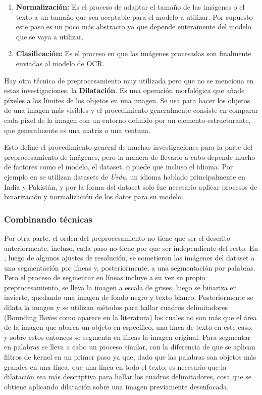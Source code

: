 \documentclass{article}
\begin{document}
\begin{enumerate}
    \item \textbf{Normalización:} Es el proceso de adaptar el tamaño de las imágenes o el texto a un tamaño que sea aceptable para el modelo a utilizar. Por supuesto este paso es un poco más abstracto ya que depende enteramente del modelo que se vaya a utilizar.

    \item \textbf{Clasificación:} Es el proceso en que las imágenes procesadas son finalmente enviadas al modelo de OCR.
\end{enumerate}

Hay otra técnica de preprocesamiento muy utilizada pero que no se menciona en estas investigaciones, la \textbf{Dilatación}. Es una operación morfológica que añade píxeles a los límites de los objetos en una imagen. Se usa para hacer los objetos de una imagen más visibles y el procedimiento generalmente consiste en comparar cada píxel de la imagen con un entorno definido por un elemento estructurante, que generalmente es una matriz o una ventana. 

Esto define el procedimiento general de muchas investigaciones para la parte del preprocesamiento de imágenes, pero la manera de llevarlo a cabo depende mucho de factores como el modelo, el dataset, o puede que incluso el idioma. Por ejemplo en \cite{3} se utilizan datasets de \emph{Urdu}, un idioma hablado principalmente en India y Pakistán, y por la forma del dataset solo fue necesario aplicar procesos de binarización y normalización de los datos para su modelo.

\subsubsection{Combinando técnicas} 
Por otra parte, el orden del preprocesamiento no tiene que ser el descrito anteriormente, incluso, cada paso no tiene por que ser independiente del resto. En \cite{4}, luego de algunos ajustes de resolución, se sometieron las imágenes del dataset a una segmentación por líneas y, posteriormente, a una segmentación por palabras. Pero el proceso de segmentar en líneas incluye a su vez su propio preprocesamiento, se lleva la imagen a escala de grises, luego se binariza en invierte, quedando una imagen de fondo negro y texto blanco. Posteriormente se dilata la imagen y se utilizan métodos para hallar cuadros delimitadores (Bounding Boxes como aparece en la literatura) los cuales no son más que el área de la imagen que abarca un objeto en específico, una línea de texto en este caso, y sobre estos entonces se segmenta en líneas la imagen original. Para segmentar en palabras se lleva a cabo un proceso similar, con la diferencia de que se aplican filtros de kernel en un primer paso ya que, dado que las palabras son objetos más grandes en una línea, que una línea en todo el texto, es necesario que la dilatación sea más descriptiva para hallar los cuadros delimitadores, cosa que se obtiene aplicando dilatación sobre una imagen previamente desenfocada.
\end{document}
